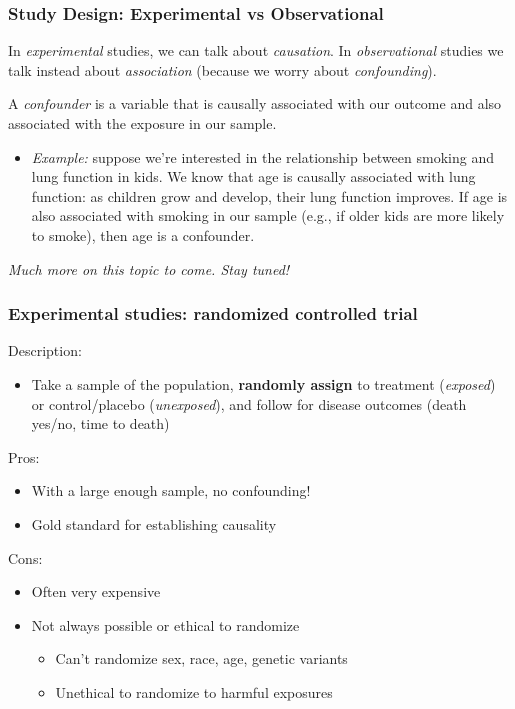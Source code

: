 \documentclass[12pt, 
hyperref={colorlinks=true, linkcolor=blue, urlcolor=cyan}]{beamer}
\begin{document}
\begin{frame}
\frametitle{Study Design: Experimental vs Observational}

In \textit{experimental} studies, we can talk about \color{blue} \textit{causation}\color{black}. In \textit{observational} studies we  talk instead about \color{blue} \textit{association} \color{black}(because we worry about \color{blue} \textit{confounding}\color{black}). %

A \color{blue} \textit{confounder} \color{black} is a variable that is causally associated with our outcome and also associated with the exposure in our sample. \vspace{-0.2cm}
\begin{itemize}
\item[] \textit{Example:} suppose we're interested in the relationship between smoking and lung function in kids. We know that age is causally associated with lung function: as children grow and develop, their lung function improves. If age is also associated with smoking in our sample (e.g., if older kids are more likely to smoke), then age is a confounder.
\end{itemize} 

\begin{small} \textit{Much more on this topic to come. Stay tuned!} \end{small}

\end{frame}

\begin{frame} %
\frametitle{Experimental studies: randomized controlled trial}
Description:\vspace{-0.3cm}
\begin{itemize}
\item Take a sample of the population, \textbf{randomly assign} to treatment (\textit{exposed}) or control/placebo (\textit{unexposed}), and follow for disease outcomes (death yes/no, time to death)
\end{itemize}

\pause
Pros:\vspace{-0.3cm}
\begin{itemize}
\item With a large enough sample, no confounding!
\item Gold standard for establishing causality
\end{itemize}

\pause
Cons:\vspace{-0.3cm}
\begin{itemize}
\item Often very expensive
\item Not always possible or ethical to randomize
	\begin{itemize}
	\item Can't randomize sex, race, age, genetic variants
	\item Unethical to randomize to harmful exposures %
	\end{itemize}
\end{itemize}
\end{frame}
\end{document}
